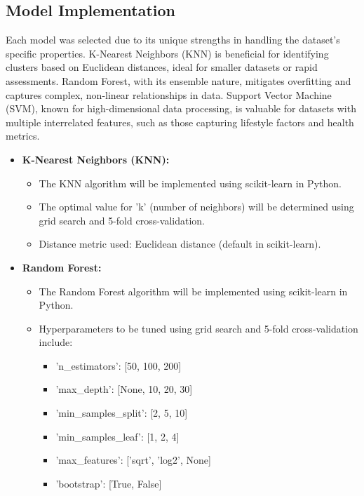 \documentclass[conference]{IEEEtran}
\begin{document}
\subsection{Model Implementation}

Each model was selected due to its unique strengths in handling the dataset’s specific properties. K-Nearest Neighbors (KNN) is beneficial for identifying clusters based on Euclidean distances, ideal for smaller datasets or rapid assessments. Random Forest, with its ensemble nature, mitigates overfitting and captures complex, non-linear relationships in data. Support Vector Machine (SVM), known for high-dimensional data processing, is valuable for datasets with multiple interrelated features, such as those capturing lifestyle factors and health metrics.

\begin{itemize}
\item \textbf{K-Nearest Neighbors (KNN):} 
    \begin{itemize}
    \item The KNN algorithm will be implemented using scikit-learn in Python.
    \item The optimal value for 'k' (number of neighbors) will be determined using grid search and 5-fold cross-validation.
    \item Distance metric used: Euclidean distance (default in scikit-learn).
    \end{itemize}

\item \textbf{Random Forest:}
    \begin{itemize}
    \item The Random Forest algorithm will be implemented using scikit-learn in Python.
    \item Hyperparameters to be tuned using grid search and 5-fold cross-validation include:
        \begin{itemize}
        \item  'n\_estimators': [50, 100, 200] 
        \item 'max\_depth': [None, 10, 20, 30] 
        \item 'min\_samples\_split': [2, 5, 10] 
        \item 'min\_samples\_leaf': [1, 2, 4] 
        \item 'max\_features': ['sqrt', 'log2', None] 
        \item 'bootstrap': [True, False] 
        \end{itemize}
    \end{itemize}


\end{itemize}
\end{document}

